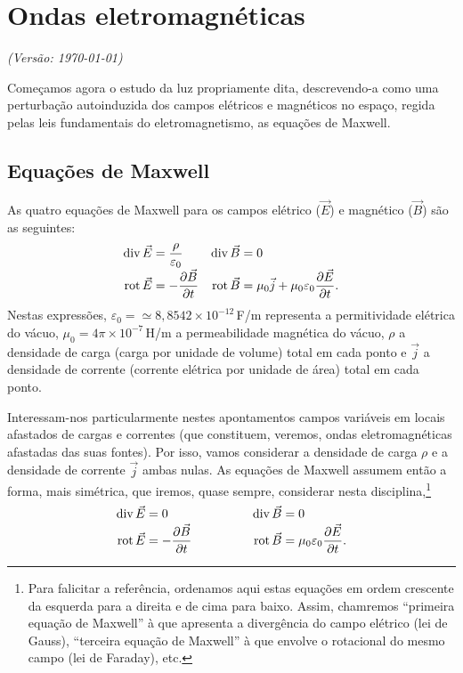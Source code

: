 \chapter{Ondas eletromagnéticas}
\textsl{{\sffamily(Versão: \today)}}

\noindent
Começamos agora o estudo da luz propriamente dita, descrevendo-a como uma
perturbação autoinduzida dos campos elétricos e magnéticos no espaço, regida
pelas leis fundamentais do eletromagnetismo, as equações de Maxwell.

\section{Equações de Maxwell}
As quatro equações de Maxwell para os campos elétrico ($\vec E$) e magnético
($\vec B$) são as seguintes:
\begin{align*}
  \div\vec E&=\frac{\rho}{\varepsilon_0}&\div\vec B&=0\\
  \rot\vec E&=-\pd{\vec B}{t}&
  \rot\vec B&=\mu_0\vec j+\mu_0\varepsilon_0\pd{\vec E}{t}.
\end{align*}
Nestas expressões, $\varepsilon_0=\simeq8,8542\times10^{-12}$\,F/m representa a
permitividade elétrica do vácuo, $\mu_0=4\pi\times10^{-7}$\,H/m a permeabilidade
magnética do vácuo, $\rho$ a densidade de carga (carga por unidade de volume)
total em cada ponto e $\vec j$ a densidade de corrente (corrente elétrica por
unidade de área) total em cada ponto.

Interessam-nos particularmente nestes apontamentos campos variáveis em locais
afastados de cargas e correntes (que constituem, veremos, ondas eletromagnéticas
afastadas das suas fontes). Por isso, vamos considerar a densidade de carga
$\rho$ e a densidade de corrente $\vec j$ ambas nulas. As equações de Maxwell
assumem então a forma, mais simétrica, que iremos, quase sempre, considerar
nesta disciplina,\footnote{Para falicitar a referência, ordenamos aqui estas
equações em ordem crescente da esquerda para a direita e de cima para baixo.
Assim, chamremos ``primeira equação de Maxwell'' à que apresenta a divergência
do campo elétrico (lei de Gauss), ``terceira equação de Maxwell'' à que envolve
    o rotacional do mesmo campo (lei de Faraday), etc.}
\begin{equation}\label{eq:meqs}
  \begin{aligned}
    \div\vec E&=0& \div\vec B&=0\\
    \rot\vec E&=-\pd{\vec B}{t}& \qquad\qquad
      \rot\vec B&=\mu_0\varepsilon_0\pd{\vec E}{t}.
  \end{aligned}
\end{equation}

